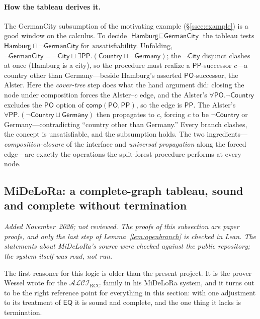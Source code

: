\documentclass[11pt]{article}
\newcommand{\ALCIRCC}[1]{\mathcal{ALCI}_{\mathrm{RCC#1}}}
\newcommand{\PO}{\mathsf{PO}}
\newcommand{\PP}{\mathsf{PP}}
\newcommand{\EQ}{\mathsf{EQ}}
\newcommand{\comp}{\ensuremath{\mathsf{comp}}}
\theoremstyle{plain}
\theoremstyle{definition}
\begin{document}
\paragraph{How the tableau derives it.} The \textsf{GermanCity} subsumption
of the motivating example (\S\ref{ssec:example}) is a good window on the
calculus. To decide $\textsf{Hamburg}\sqsubseteq\textsf{GermanCity}$ the
tableau tests $\textsf{Hamburg}\sqcap\neg\textsf{GermanCity}$ for
\emph{un}satisfiability. Unfolding,
$\neg\textsf{GermanCity}=\neg\textsf{City}\sqcup
\exists\PP.(\textsf{Country}\sqcap\neg\textsf{Germany})$; the
$\neg\textsf{City}$ disjunct clashes at once (Hamburg is a city), so the
procedure must realize a $\PP$-successor $c$---a country other than
Germany---beside Hamburg's asserted $\PO$-successor, the Alster. Here the
\emph{cover-tree} step does what the hand argument did: closing the node
under composition forces the Alster--$c$ edge, and the Alster's
$\forall\PO.\neg\textsf{Country}$ excludes the $\PO$ option of
$\comp(\PO,\PP)$, so the edge is $\PP$. The Alster's
$\forall\PP.(\neg\textsf{Country}\sqcup\textsf{Germany})$ then propagates to
$c$, forcing $c$ to be $\neg\textsf{Country}$ or
\textsf{Germany}---contradicting ``country other than Germany.'' Every
branch clashes, the concept is unsatisfiable, and the subsumption holds.
The two ingredients---\emph{composition-closure} of the interface and
\emph{universal propagation} along the forced edge---are exactly the
operations the split-forest procedure performs at every node.

\subsection{MiDeLoRa: a complete-graph tableau, sound and complete without termination}
\label{ssec:midelora}

\emph{Added November~2026; not reviewed. The proofs of this subsection are
paper proofs, and only the last step of Lemma~\ref{lem:openbranch} is checked
in Lean. The statements about MiDeLoRa's source were checked against the
public repository; the system itself was read, not run.}

The first reasoner for this logic is older than the present project. It is the
prover Wessel wrote for the $\ALCIRCC{}$ family in his MiDeLoRa system, and it
turns out to be the right reference point for everything in this section: with
one adjustment to its treatment of $\EQ$ it is sound and complete, and the one
thing it lacks is termination.
\end{document}
